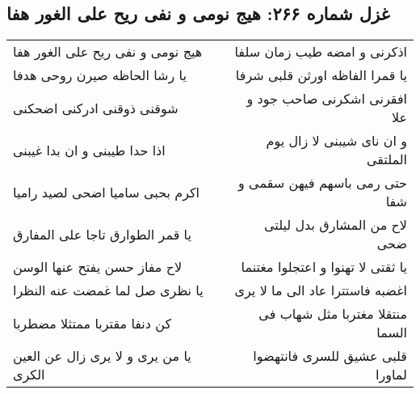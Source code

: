 \begin{center}
\section*{غزل شماره ۲۶۶: هیج نومی و نفی ریح علی الغور هفا}
\label{sec:0266}
\begin{longtable}{l p{0.5cm} r}
هیج نومی و نفی ریح علی الغور هفا
&&
اذکرنی و امضه طیب زمان سلفا
\\
یا رشا الحاظه صیرن روحی هدفا
&&
یا قمرا الفاظه اورثن قلبی شرفا
\\
شوقنی ذوقنی ادرکنی اضحکنی
&&
افقرنی اشکرنی صاحب جود و علا
\\
اذا حدا طیبنی و ان بدا غیبنی
&&
و ان نای شیبنی لا زال یوم الملتقی
\\
اکرم بحبی سامیا اضحی لصید رامیا
&&
حتی رمی باسهم فیهن سقمی و شفا
\\
یا قمر الطوارق تاجا علی المفارق
&&
لاح من المشارق بدل لیلتی ضحی
\\
لاح مفاز حسن یفتح عنها الوسن
&&
یا ثقتی لا تهنوا و اعتجلوا مغتنما
\\
یا نظری صل لما غمضت عنه النظرا
&&
اغضبه فاستترا عاد الی ما لا یری
\\
کن دنفا مقتربا ممتثلا مضطربا
&&
منتقلا مغتربا مثل شهاب فی السما
\\
یا من یری و لا یری زال عن العین الکری
&&
قلبی عشیق للسری فانتهضوا لماورا
\\
\end{longtable}
\end{center}
